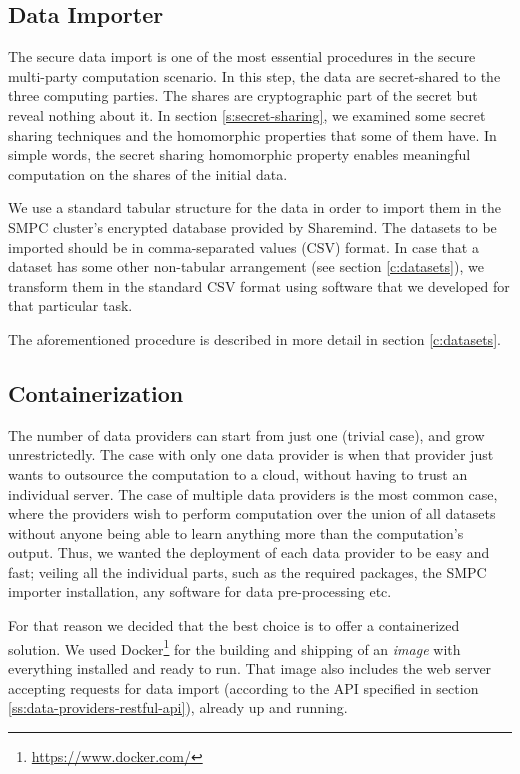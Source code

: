 \subsection{Data Importer}\label{ss:data-providers-importer}
The secure data import is one of the most essential procedures in the secure multi-party computation scenario.
In this step, the data are secret-shared to the three computing parties.
The shares are cryptographic part of the secret but reveal nothing about it.
In section \ref{s:secret-sharing}, we examined some secret sharing techniques and the homomorphic properties that some of them have.
In simple words, the secret sharing homomorphic property enables meaningful computation on the shares of the initial data.

We use a standard tabular structure for the data in order to import them in the SMPC cluster's encrypted database provided by Sharemind.
The datasets to be imported should be in comma-separated values (CSV) format.
In case that a dataset has some other non-tabular arrangement (see section \ref{c:datasets}), we transform them in the standard CSV format using software that we developed for that particular task.

The aforementioned procedure is described in more detail in section \ref{c:datasets}.




\subsection{Containerization}\label{ss:data-providers-containerization}
The number of data providers can start from just one (trivial case), and grow unrestrictedly.
The case with only one data provider is when that provider just wants to outsource the computation to a cloud, without having to trust an individual server.
The case of multiple data providers is the most common case, where the providers wish to perform computation over the union of all datasets without anyone being able to learn anything more than the computation's output.
Thus, we wanted the deployment of each data provider to be easy and fast; veiling all the individual parts, such as the required packages, the SMPC importer installation, any software for data pre\hyp processing etc.

For that reason we decided that the best choice is to offer a containerized solution. We used Docker\footnote{\href{https://www.docker.com/}{https://www.docker.com/}} for the building and shipping of an \textit{image} with everything installed and ready to run.
That image also includes the web server accepting requests for data import (according to the API specified in section \ref{ss:data-providers-restful-api}), already up and running.


